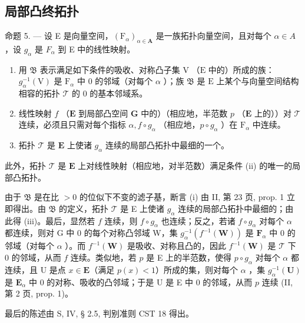 \subsection{局部凸终拓扑}

命题 5. --- 设 E 是向量空间，\((\mathrm{F}_{\alpha})_{\alpha\in\mathbf{A}}\) 是一族拓扑向量空间，且对每个 \(\alpha\in A\) ，设 \(g_{\alpha}\) 是 \(F_{\alpha}\) 到 E 中的线性映射。

\begin{enumerate}
\def\labelenumi{(\roman{enumi})}
\item
  用 \(\mathfrak{B}\) 表示满足如下条件的吸收、对称凸子集 \(\mathrm{V}\) （\(\mathrm{E}\) 中的）所成的族：\(g_{\alpha}^{-1}(\mathrm{V})\) 是 \(\mathrm{F}_{\alpha}\) 中 0 的邻域（对每个 \(\alpha\) ）；族 \(\mathfrak{B}\) 是 \(\mathrm{E}\) 上某个与向量空间结构相容的拓扑 \(\mathcal{T}\) 的 0 的基本邻域系。
\item
  线性映射 \(f\) （\(\mathbf{E}\) 到局部凸空间 \(\mathbf{G}\) 中的）（相应地，半范数 \(p\) （\(\mathbf{E}\) 上的））对 \(\mathcal{T}\) 连续，必须且只需对每个指标 \(\alpha, f \circ g_{\alpha}\) （相应地，\(p \circ g_{\alpha}\) ）在 \(\mathrm{F}_{\alpha}\) 中连续。
\item
  拓扑 \(\mathcal{T}\) 是 \(\mathbf{E}\) 上使诸 \(g_{\alpha}\) 连续的局部凸拓扑中最细的一个。
\end{enumerate}

此外，拓扑 \(\mathcal{T}\) 是 \(\mathbf{E}\) 上对线性映射（相应地，对半范数）满足条件 (ii) 的唯一的局部凸拓扑。

由于 \(\mathfrak{B}\) 是在比 \(>0\) 的位似下不变的滤子基，断言 (i) 由 II, 第 23 页, prop. 1 立即得出。由 \(\mathfrak{B}\) 的定义，拓扑 \(\mathcal{T}\) 是 E 上使诸 \(g_{\alpha}\) 连续的局部凸拓扑中最细的；由此得 (iii)。最后，显然若 \(f\) 连续，则 \(f \circ g_{\alpha}\) 也连续；反之，若诸 \(f \circ g_{\alpha}\) 对每个 \(\alpha\) 都连续，则对 G 中 0 的每个对称凸邻域 W，集 \(g_{\alpha}^{-1}(f^{-1}(\mathbf{W}))\) 是 \(\mathbf{F}_{\alpha}\) 中 0 的邻域（对每个 \(\alpha\) ）。而 \(f^{-1}(\mathbf{W})\) 是吸收、对称且凸的，因此 \(f^{-1}(\mathbf{W})\) 是 \(\mathcal{T}\) 下 0 的邻域，从而 \(f\) 连续。类似地，若 \(p\) 是 E 上的半范数，使得 \(p \circ g_{\alpha}\) 对每个 \(\alpha\) 都连续，且 U 是点 \(x \in \mathbf{E}\)（满足 \(p(x) < 1\)）所成的集，则对每个 \(\alpha\) ，集 \(g_{\alpha}^{-1}(\mathbf{U})\) 是 \(\mathbf{E}_{\alpha}\) 中 0 的对称、吸收的凸邻域；于是 U 是 E 中 0 的邻域，从而 \(p\) 连续 (II, 第 2 页, prop. 1)。

最后的陈述由 S, IV, § 2.5, 判别准则 CST 18 得出。

